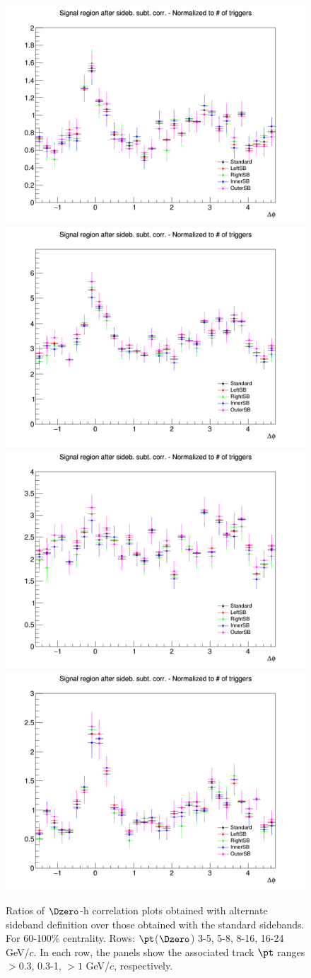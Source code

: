 \begin{figure}
{\includegraphics[width=0.31\linewidth]{figuresVsCent/Dzero/SystSideb/60100/AzimCorrDistr_Dzero_Canvas_PtIntBins6to8_PoolInt_thr1to99_Superimp.png}} \\
{\includegraphics[width=0.31\linewidth]{figuresVsCent/Dzero/SystSideb/60100/AzimCorrDistr_Dzero_Canvas_PtIntBins9to11_PoolInt_thr03to99_Superimp.png}}
{\includegraphics[width=0.31\linewidth]{figuresVsCent/Dzero/SystSideb/60100/AzimCorrDistr_Dzero_Canvas_PtIntBins9to11_PoolInt_thr03to1_Superimp.png}}
{\includegraphics[width=0.31\linewidth]{figuresVsCent/Dzero/SystSideb/60100/AzimCorrDistr_Dzero_Canvas_PtIntBins9to11_PoolInt_thr1to99_Superimp.png}}  \\
 \caption{Ratios of $\Dzero$-h correlation plots obtained with alternate sideband definition over those obtained with the standard sidebands. For 60-100\% centrality. Rows: $\pt$($\Dzero$) 3-5, 5-8, 8-16, 16-24 GeV/$c$. In each row, the panels show the associated track $\pt$ ranges $> 0.3$, 0.3-1, $> 1$ GeV/$c$, respectively.}
\label{fig:SysBkg60100}
\end{figure}




